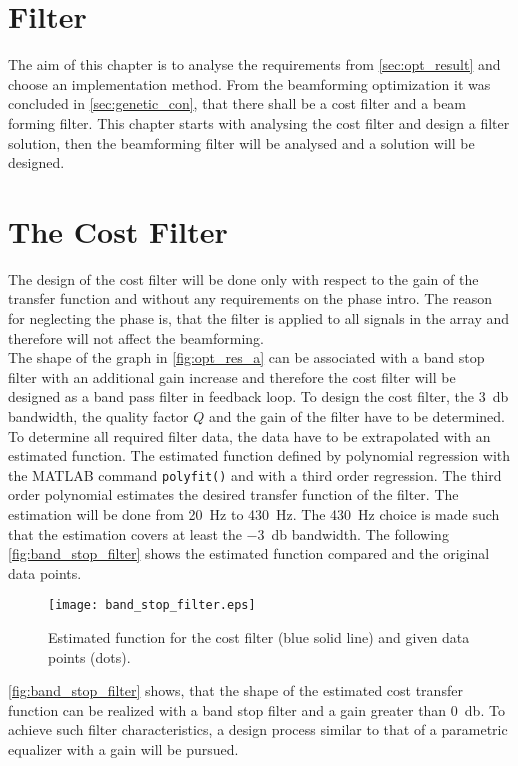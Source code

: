 \section{Filter}\label{sec:filter_design}

The aim of this chapter is to analyse the requirements from \ref{sec:opt_result} and choose an implementation method. From the beamforming optimization it was concluded in \autoref{sec:genetic_con}, that there shall be a cost filter and a beam forming filter. This chapter starts with analysing the cost filter and design a filter solution, then the beamforming filter will be analysed and a solution will be designed.


\section{The Cost Filter}
The design of the cost filter will be done only with respect to the gain of the transfer function and without any requirements on the phase intro. The reason for neglecting the phase is, that the filter is applied to all signals in the array and therefore will not affect the beamforming. \\
The shape of the graph in \autoref{fig:opt_res_a} can be associated with a band stop filter with an additional gain increase and therefore the cost filter will be designed as a band pass filter in feedback loop. To design the cost filter, the \SI{3}{\decibel} bandwidth, the quality factor $Q$ and the gain of the filter have to be determined. To determine all required filter data, the data have to be extrapolated with an estimated function. The estimated function defined by polynomial regression with the MATLAB command \texttt{polyfit()} and with a third order regression. The third order polynomial estimates the desired transfer function of the filter. The estimation will be done from \SI{20}{\hertz} to \SI{430}{\hertz}. The \SI{430}{\hertz} choice is made such that the estimation covers at least the \SI{-3}{\decibel} bandwidth. The following \autoref{fig:band_stop_filter} shows the estimated function compared and the original data points.

\begin{figure}[H]
	\centering
	\texttt{[image: band\_stop\_filter.eps]}
	\caption{Estimated function for the cost filter (blue solid line) and given data points (dots).}
		\label{fig:band_stop_filter}
\end{figure}

\autoref{fig:band_stop_filter} shows, that the shape of the estimated cost transfer function can be realized with a band stop filter and a gain greater than \SI{0}{\decibel}. To achieve such filter characteristics, a design process similar to that of a parametric equalizer with a gain will be pursued. \\

